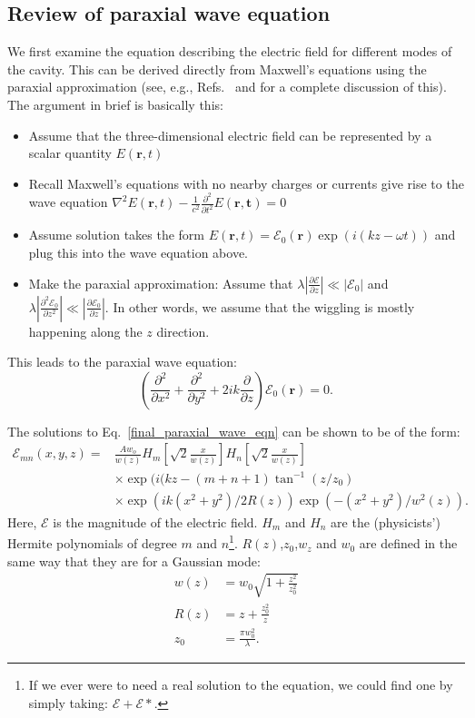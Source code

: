 \subsection{Review of paraxial wave equation}

We first examine the equation describing the electric field for different modes of the cavity. This can be derived directly from Maxwell's equations using the paraxial approximation (see, e.g., Refs.\ \cite{lasersMilonniEberly} and \cite{bergeson_amo_notes} for a complete discussion of this). The argument in brief is basically this: 
\begin{itemize}
\item Assume that the three-dimensional electric field can be represented by a scalar quantity $E(\mathbf{r},t)$
\item Recall Maxwell's equations with no nearby charges or currents give rise to the wave equation $\nabla^2E(\mathbf{r},t)-\frac{1}{c^2} \frac{\partial^2}{\partial t^2} E(\mathbf{r,t})=0$
\item Assume solution takes the form $E(\mathbf{r},t) = \mathcal{E}_0(\mathbf{r}) \exp(i(kz-\omega t))$ and plug this into the wave equation above. 
\item Make the paraxial approximation: Assume that $\lambda \left|\frac{\partial \mathcal{E}}{\partial z} \right| \ll |\mathcal{E}_0|$ and $\lambda \left| \frac{\partial^2\mathcal{E}_0}{\partial z^2}\right| \ll \left| \frac{\partial \mathcal{E}_0}{\partial z}\right|$. In other words, we assume that the wiggling
is mostly happening along the $z$ direction. 
\end{itemize}
This leads to the paraxial wave equation: 
\begin{equation}
\left(\frac{\partial^2}{\partial x^2}+\frac{\partial^2}{\partial y^2}+2ik\frac{\partial}{\partial z}\right) \mathcal{E}_0(\mathbf{r})=0 \label{final_paraxial_wave_eqn}.
\end{equation}

The solutions to Eq.\ \ref{final_paraxial_wave_eqn} can be shown to be of the form:
\begin{align} \label{solutionToParaxial}
\mathcal{E}_{mn}(x,y,z)=&\frac{Aw_o}{w(z)}H_m\left[\sqrt{2}\frac{x}{w(z)}\right]H_n\left[\sqrt{2}\frac{x}{w(z)}\right] \\
&\times \exp(i(kz-(m+n+1)\tan^{-1}(z/z_0)\\
&\times \exp(ik(x^2+y^2)/2R(z)) \exp(-(x^2+y^2)/w^2(z)).
\end{align}
Here, $\mathcal{E}$ is the magnitude of the electric field. $H_m$ and $H_n$ are the (physicists') Hermite polynomials of degree $m$ and $n$\footnote{If we ever were to need a real solution to the equation, we could find one by simply taking: $\mathcal{E}+\mathcal{E}*$.}. $R(z)$,$z_0$,$w_z$ and $w_0$ are defined in the same way that they are for a Gaussian mode:
\begin{align}
w(z)&=w_0 \sqrt{1+\frac{z^2}{z_0^2}} \\
R(z)&=z+\frac{z_0^2}{z}\\
z_0&=\frac{\pi w_0^2}{\lambda }.
\end{align}

